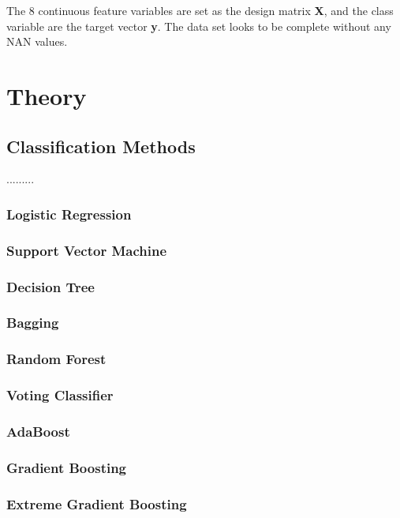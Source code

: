 \documentclass[12pt,a4paper,english]{article}
\begin{document}
The 8 continuous feature variables are set as the design matrix \textbf{X}, and the class variable are the target vector \textbf{y}. The data set looks to be complete without any NAN values.

\section{Theory}
\label{sect:Theory}
\subsection{Classification Methods}
\label{subsect:class_methods}
.........
\subsubsection{Logistic Regression}
\label{subsubsect:LR}
\subsubsection{Support Vector Machine}
\label{subsubsect:SVM}
\subsubsection{Decision Tree}
\label{subsubsect:Tree}
\subsubsection{Bagging}
\label{subsubsect:Bag}
\subsubsection{Random Forest}
\label{subsubsect:Forest}
\subsubsection{Voting Classifier}
\label{subsubsect:Vote}
\subsubsection{AdaBoost}
\label{subsubsect:Ada}
\subsubsection{Gradient Boosting}
\label{subsubsect:Grad}
\subsubsection{Extreme Gradient Boosting}
\label{subsubsect:XGB}
\end{document}
